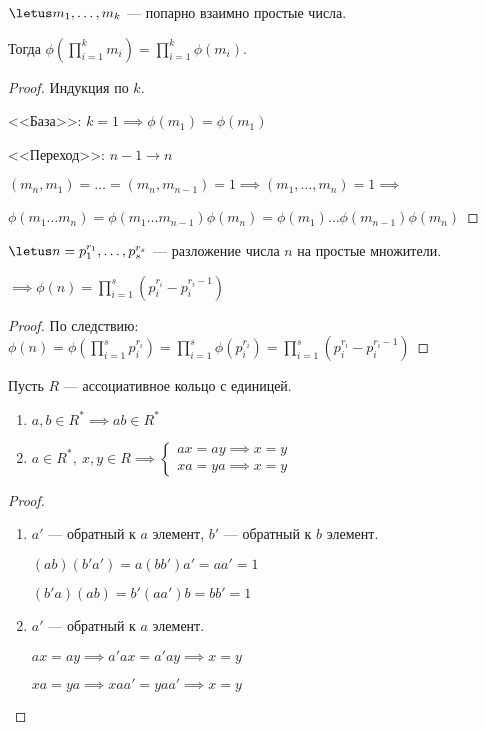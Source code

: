 \begin{follow}
    $\letus m_1, \ldots, m_k$ --- попарно взаимно простые числа.

    Тогда $\phi(\prod\limits_{i=1}^k m_i) = \prod\limits_{i=1}^k \phi(m_i)$.
\end{follow}

\begin{proof}
    Индукция по $k$.

    <<База>>: $k = 1 \implies \phi(m_1) = \phi(m_1)$
    
    <<Переход>>: $n-1 \to n$
    
    $(m_n, m_1) = \ldots = (m_n, m_{n-1}) = 1 \implies (m_1, \ldots, m_n) = 1 \implies$
    
    $\phi(m_1 \ldots m_n) = \phi(m_1 \ldots m_{n-1}) \phi(m_n) = \phi(m_1) \ldots \phi(m_{n-1}) \phi(m_n)$
\end{proof}

\begin{follow}
    $\letus n = p_1^{r_1}, \ldots, p_s^{r_s}$ --- разложение числа $n$ на простые множители.
    
    $\implies \phi(n) = \prod\limits_{i=1}^s (p_i^{r_i} - p_i^{r_i-1})$
\end{follow}

\begin{proof}
    По следствию: $\phi(n) = \phi(\prod\limits_{i=1}^s p_i^{r_i}) = \prod\limits_{i=1}^s \phi(p_i^{r_i}) = \prod\limits_{i=1}^s (p_i^{r_i} - p_i^{r_i-1})$
\end{proof}

\begin{lemma} 
    Пусть $R$ --- ассоциативное кольцо с единицей.
    \begin{enumerate}
        \item $a, b \in R^* \implies ab \in R^*$
        
        \item $a \in R^*,~ x,y \in R \implies \begin{cases}
            ax = ay \implies x = y\\
            xa = ya \implies x = y
        \end{cases}$
    \end{enumerate}
\end{lemma}

\begin{proof}
    \begin{enumerate}
        \item $a'$ --- обратный к $a$ элемент, $b'$ --- обратный к $b$ элемент.
        
        $(ab)(b'a') = a(bb')a' = aa' = 1$
        
        $(b'a)(ab) = b'(aa')b = bb' = 1$
        
        \item $a'$ --- обратный к $a$ элемент.
        
        $ax = ay \implies a'ax = a'ay \implies x = y$
        
        $xa = ya \implies xaa' = yaa' \implies x = y$
    \end{enumerate}
\end{proof}

